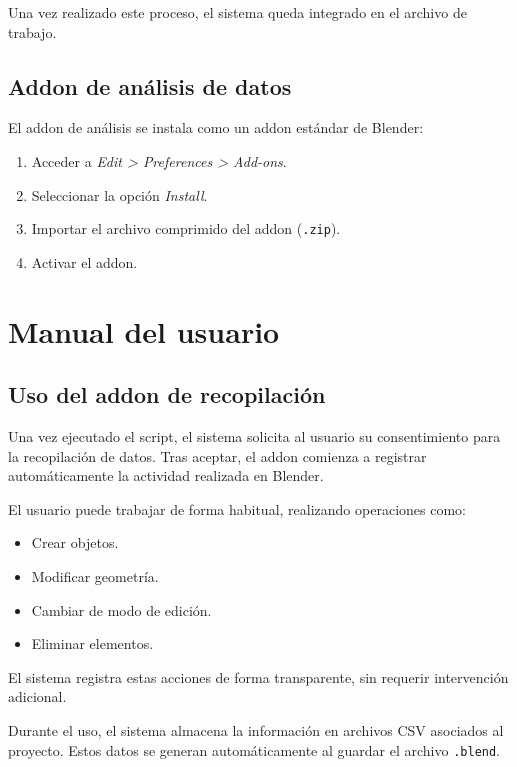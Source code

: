 Una vez realizado este proceso, el sistema queda integrado en el archivo de trabajo.

\subsection{Addon de análisis de datos}

El addon de análisis se instala como un addon estándar de Blender:

\begin{enumerate}
    \item Acceder a \textit{Edit > Preferences > Add-ons}.
    \item Seleccionar la opción \textit{Install}.
    \item Importar el archivo comprimido del addon (\texttt{.zip}).
    \item Activar el addon.
\end{enumerate}

\section{Manual del usuario}

\subsection{Uso del addon de recopilación}

Una vez ejecutado el script, el sistema solicita al usuario su consentimiento para la recopilación de datos. Tras aceptar, el addon comienza a registrar automáticamente la actividad realizada en Blender.

El usuario puede trabajar de forma habitual, realizando operaciones como:

\begin{itemize}
    \item Crear objetos.
    \item Modificar geometría.
    \item Cambiar de modo de edición.
    \item Eliminar elementos.
\end{itemize}

El sistema registra estas acciones de forma transparente, sin requerir intervención adicional.

Durante el uso, el sistema almacena la información en archivos CSV asociados al proyecto. Estos datos se generan automáticamente al guardar el archivo \texttt{.blend}.

